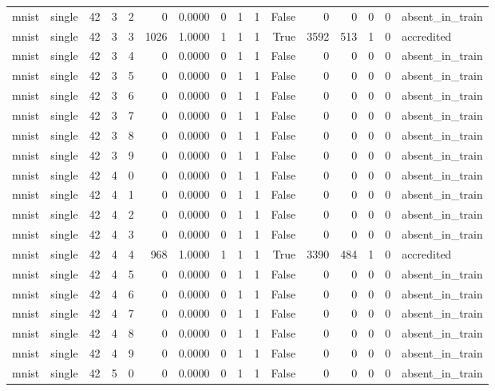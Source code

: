 \begin{tabular}{llrrrrrrrrrrrrrl}
mnist & single & 42 & 3 & 2 & 0 & 0.0000 & 0 & 1 & 1 & False & 0 & 0 & 0 & 0 & absent\_in\_train \\
mnist & single & 42 & 3 & 3 & 1026 & 1.0000 & 1 & 1 & 1 & True & 3592 & 513 & 1 & 0 & accredited \\
mnist & single & 42 & 3 & 4 & 0 & 0.0000 & 0 & 1 & 1 & False & 0 & 0 & 0 & 0 & absent\_in\_train \\
mnist & single & 42 & 3 & 5 & 0 & 0.0000 & 0 & 1 & 1 & False & 0 & 0 & 0 & 0 & absent\_in\_train \\
mnist & single & 42 & 3 & 6 & 0 & 0.0000 & 0 & 1 & 1 & False & 0 & 0 & 0 & 0 & absent\_in\_train \\
mnist & single & 42 & 3 & 7 & 0 & 0.0000 & 0 & 1 & 1 & False & 0 & 0 & 0 & 0 & absent\_in\_train \\
mnist & single & 42 & 3 & 8 & 0 & 0.0000 & 0 & 1 & 1 & False & 0 & 0 & 0 & 0 & absent\_in\_train \\
mnist & single & 42 & 3 & 9 & 0 & 0.0000 & 0 & 1 & 1 & False & 0 & 0 & 0 & 0 & absent\_in\_train \\
mnist & single & 42 & 4 & 0 & 0 & 0.0000 & 0 & 1 & 1 & False & 0 & 0 & 0 & 0 & absent\_in\_train \\
mnist & single & 42 & 4 & 1 & 0 & 0.0000 & 0 & 1 & 1 & False & 0 & 0 & 0 & 0 & absent\_in\_train \\
mnist & single & 42 & 4 & 2 & 0 & 0.0000 & 0 & 1 & 1 & False & 0 & 0 & 0 & 0 & absent\_in\_train \\
mnist & single & 42 & 4 & 3 & 0 & 0.0000 & 0 & 1 & 1 & False & 0 & 0 & 0 & 0 & absent\_in\_train \\
mnist & single & 42 & 4 & 4 & 968 & 1.0000 & 1 & 1 & 1 & True & 3390 & 484 & 1 & 0 & accredited \\
mnist & single & 42 & 4 & 5 & 0 & 0.0000 & 0 & 1 & 1 & False & 0 & 0 & 0 & 0 & absent\_in\_train \\
mnist & single & 42 & 4 & 6 & 0 & 0.0000 & 0 & 1 & 1 & False & 0 & 0 & 0 & 0 & absent\_in\_train \\
mnist & single & 42 & 4 & 7 & 0 & 0.0000 & 0 & 1 & 1 & False & 0 & 0 & 0 & 0 & absent\_in\_train \\
mnist & single & 42 & 4 & 8 & 0 & 0.0000 & 0 & 1 & 1 & False & 0 & 0 & 0 & 0 & absent\_in\_train \\
mnist & single & 42 & 4 & 9 & 0 & 0.0000 & 0 & 1 & 1 & False & 0 & 0 & 0 & 0 & absent\_in\_train \\
mnist & single & 42 & 5 & 0 & 0 & 0.0000 & 0 & 1 & 1 & False & 0 & 0 & 0 & 0 & absent\_in\_train \\

\end{tabular}
